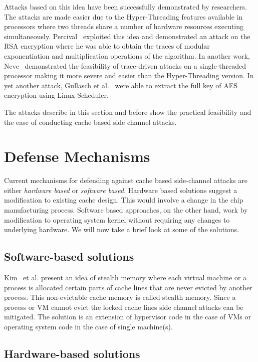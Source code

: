 \documentclass[onecolumn]{IEEEtran}
\begin{document}
Attacks based on this idea have been successfully demonstrated by
researchers.  The attacks are made easier due to the Hyper-Threading
features available in processors where two threads share a number of
hardware resources executing simultaneously.
Percival~\cite{percival2005cache} exploited this idea and demonstrated
an attack on the RSA encryption where he was able to obtain the traces
of modular exponentiation and multiplication operations of the
algorithm.  In another work, Neve~\cite{neve2006advances} demonstrated
the feasibility of trace-driven attacks on a single-threaded processor
making it more severe and easier than the Hyper-Threading version.  In
yet another attack, Gullasch et al.~\cite{gullasch2011cache} were able
to extract the full key of AES encryption using Linux Scheduler.

The attacks describe in this section and before show the practical
feasibility and the ease of conducting cache based side channel
attacks.

\section{Defense Mechanisms}

Current mechanisms for defending against cache based side-channel
attacks are either {\it hardware based} or {\it software based}.
Hardware based solutions suggest a modification to existing cache
design.  This would involve a change in the chip manufacturing
process.  Software based approaches, on the other hand, work by
modification to operating system kernel without requiring any changes
to underlying hardware.  We will now take a brief look at some of the
solutions.

\subsection{Software-based solutions}

Kim~\cite{kim2012stealthmem} et al. present an idea of stealth memory
where each virtual machine or a process is allocated certain parts of
cache lines that are never evicted by another process.  This
non-evictable cache memory is called stealth memory.  Since a process
or VM cannot evict the locked cache lines side channel attacks can be
mitigated.  The solution is an extension of hypervisor code in the
case of VMs or operating system code in the case of single machine(s).

\subsection{Hardware-based solutions}
\end{document}
